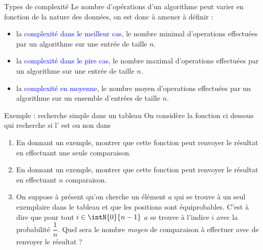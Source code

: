 \documentclass[10pt]{beamer}
\begin{document}
\begin{frame}[fragile]{\Ctitle}{\stitle}
    \begin{alertblock}{Types de complexité}
    Le nombre d'opérations d'un algorithme peut varier en fonction de la nature des données, on est donc à amener à définir :
        \begin{itemize}
            \item<4-> la \textcolor{blue}{complexité dans le meilleur cas}, le nombre minimal d'operations effectuées par un algorithme sur une entrée de taille $n$.
            \item<5-> la \textcolor{blue}{complexité dans le pire cas}, le nombre maximal d'operations effectuées par un algorithme sur une entrée de taille $n$.
            \item<6-> la \textcolor{blue}{complexité en moyenne}, le nombre moyen d'operations effectuées par un algorithme sur un ensemble d'entrées de taille $n$.
        \end{itemize}
    \end{alertblock}
\end{frame} 



\begin{frame}[fragile]{\Ctitle}{\stitle}
    \begin{exampleblock}{Exemple : recherche simple dans un tableau}
        {\small On considère la fonction ci dessous qui recherche si l' est ou non dans {}}
    \begin{enumerate}
        \item<3-> {\small En donnant un exemple, montrer que cette fonction peut renvoyer le résultat en effectuant une seule comparaison.}
        \item<4-> {\small En donnant un exemple, montrer que cette fonction peut renvoyer le résultat en effectuant $n$ comparaison.}
        \item<5-> {\small On suppose à présent qu'on cherche un élément $a$ qui se trouve à un seul exemplaire dans le tableau et que les positions sont équiprobables. C'est à dire que pour tout $i \in \intN{0}{n-1}$ $a$ se trouve à l'indice $i$ avec la probabilité $\dfrac{1}{n}$. Quel sera le nombre \textit{moyen} de comparaison à effectuer avec de renvoyer le résultat ?}
    \end{enumerate}
\end{exampleblock}
\end{frame}
\end{document}
